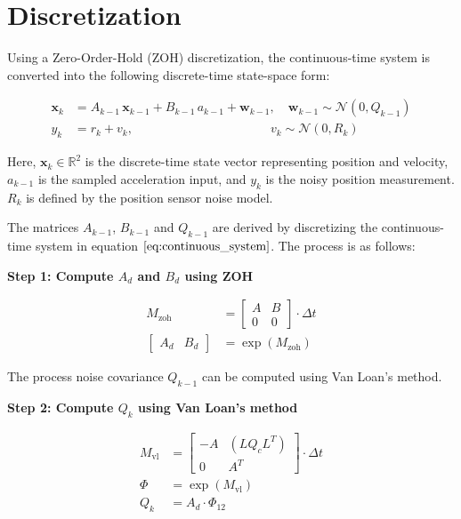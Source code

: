 \section{Discretization}

Using a Zero-Order-Hold (ZOH) discretization, the continuous-time system is converted into 
the following discrete-time state-space form:

\begin{align}
    \mathbf{x}_k &= A_{k-1} \, \mathbf{x}_{k-1} + B_{k-1} \, a_{k-1} + \mathbf{w}_{k-1}, \quad \mathbf{w}_{k-1} \sim \mathcal{N}(0, Q_{k-1}) \\
    y_k &= r_k + v_k, \quad\quad\quad\quad\quad\quad\quad\quad\quad\quad\quad v_k \sim \mathcal{N}(0, R_k)
\end{align}

Here, \( \mathbf{x}_k \in \mathbb{R}^2 \) is the discrete-time state vector representing position and velocity,  
\( a_{k-1} \) is the sampled acceleration input, and  \( y_k \) is the noisy position measurement.
\( R_k \) is defined by the position sensor noise model.

The matrices \( A_{k-1} \), \( B_{k-1} \) and \( Q_{k-1} \)  are derived by discretizing the continuous-time 
system in equation \(\ref{eq:continuous_system}\). The process is as follows:

\clearpage

\textbf{Step 1: Compute \( A_d \) and \( B_d \) using ZOH}

\begin{align}
    M_{\text{zoh}} &= \begin{bmatrix}
    A & B \\
    0 & 0
    \end{bmatrix} \cdot \Delta t \\
    \begin{bmatrix} A_d & B_d \end{bmatrix} &= \exp(M_{\text{zoh}})
\end{align}

The process noise covariance \( Q_{k-1} \) can be computed using Van Loan’s method.

\textbf{Step 2: Compute \( Q_k \) using Van Loan's method}

\begin{align}
    M_{\text{vl}} &= \begin{bmatrix}
    -A & (L Q_c L^T) \\
    0 & A^T
    \end{bmatrix} \cdot \Delta t \\
    \Phi &= \exp(M_{\text{vl}}) \\
    Q_k &= A_d \cdot \Phi_{12}
\end{align}